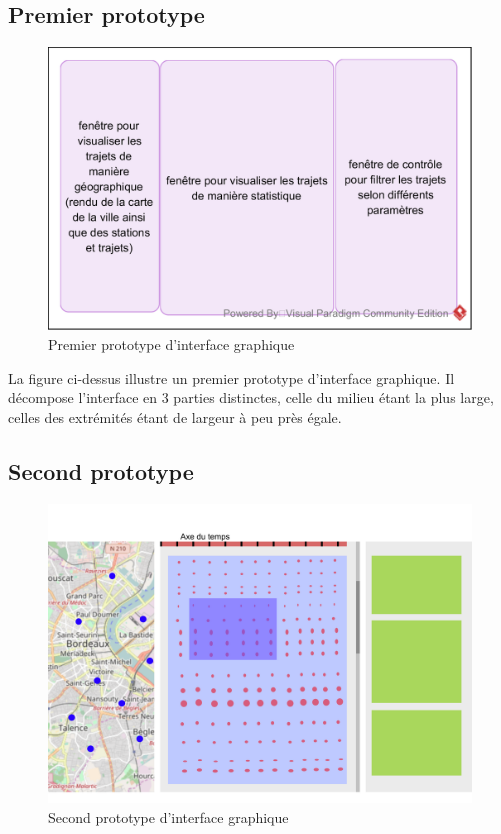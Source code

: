 \documentclass[12pt]{article}
\begin{document}
		\subsection{Premier prototype}
		\begin{figure}[!h]
		\begin{center}
		\includegraphics[scale=1]{dia_proto-interface_1.png}
		\caption{Premier prototype d’interface graphique}
		\end{center}
		\end{figure}
		
		La figure ci-dessus illustre un premier prototype d’interface graphique. Il décompose l’interface en 3 parties distinctes, celle du milieu étant la plus large, celles des extrémités étant de largeur à peu près égale.
		
		\subsection{Second prototype}
		\begin{figure}[!h]
		\begin{center}
		\includegraphics[scale=.5]{dia_proto-interface_2.png}
		\caption{Second prototype d’interface graphique}
		\label{fig:proto_int_2}
		\end{center}
		\end{figure}
		
\end{document}
